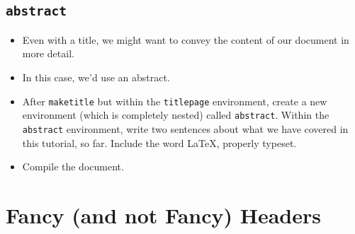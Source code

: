 \subsection*{\texttt{abstract}}

\begin{itemize}

\item Even with a title, we might want to convey the content of our document in
  more detail.

\item In this case, we'd use an abstract.

\item After \verb=maketitle= but within the \verb=titlepage= environment, create
  a new environment (which is completely nested) called
  \texttt{abstract}. Within the \texttt{abstract} environment, write two
  sentences about what we have covered in this tutorial, so far. Include the
  word \LaTeX{}, properly typeset.

\item Compile the document.

\end{itemize}

\section{Fancy (and not Fancy) Headers}


